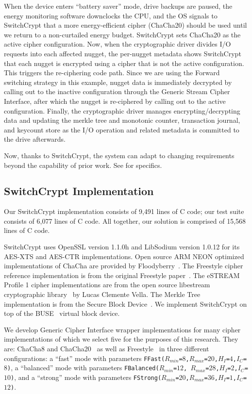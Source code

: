 When the device enters ``battery saver'' mode, drive backups are paused, the
energy monitoring software downclocks the CPU, and the OS signals to SwitchCrypt
that a more energy-efficient cipher (ChaCha20) should be used until we return to
a non-curtailed energy budget. SwitchCrypt sets ChaCha20 as the active cipher
configuration. Now, when the cryptographic driver divides I/O requests into each
affected nugget, the per-nugget metadata shows SwitchCrypt that each nugget is
encrypted using a cipher that is not the active configuration. This triggers the
re-ciphering code path. Since we are using the Forward switching strategy in
this example, nugget data is immediately decrypted by calling out to the
inactive configuration through the Generic Stream Cipher Interface, after which
the nugget is re-ciphered by calling out to the active configuration. Finally,
the cryptographic driver manages encrypting/decrypting data and updating the
merkle tree and monotonic counter, transaction journal, and keycount store as
the I/O operation and related metadata is committed to the drive afterwards.

Now, thanks to SwitchCrypt, the system can adapt to changing requirements beyond
the capability of prior work. See  for specifics.

\subsection{SwitchCrypt Implementation} \label{subsec:implementation}

Our SwitchCrypt implementation consists of 9,491 lines of C code; our test suite
consists of 6,077 lines of C code. All together, our solution is comprised of
15,568 lines of C code.

SwitchCrypt uses OpenSSL version 1.1.0h and LibSodium version 1.0.12 for its
AES-XTS and AES-CTR implementations. Open source ARM NEON optimized
implementations of ChaCha are provided by Floodyberry~\cite{Floodyberry}. The
Freestyle cipher reference implementation is from the original Freestyle
paper~\cite{Freestyle}. The eSTREAM Profile 1 cipher implementations are from
the open source libestream cryptographic library~\cite{libestream} by Lucas
Clemente Vella. The Merkle Tree implementation is from the Secure Block
Device~\cite{SBD}. We implement SwitchCrypt on top of the BUSE~\cite{BUSE}
virtual block device.

We develop Generic Cipher Interface wrapper implementations for many cipher
implementations of which we select five for the purposes of this research. They
are: ChaCha8 and ChaCha20~\cite{ChaCha20} as well as Freestyle~\cite{Freestyle}
in three different configurations: a ``fast'' mode with parameters
\texttt{FFast($R_{min}$=$8$,$R_{max}$=$20$,$H_I$=$4$,$I_C$=$8$)}, a ``balanced''
mode with parameters \texttt{FBalanced($R_{min}$=$12$,
$R_{max}$=$28$,$H_I$=$2$,$I_C$=$10$)}, and a ``strong'' mode with parameters
\texttt{FStrong($R_{min}$=$20$,$R_{max}$=$36$,$H_I$=$1$,$I_C$=$12$)}.
